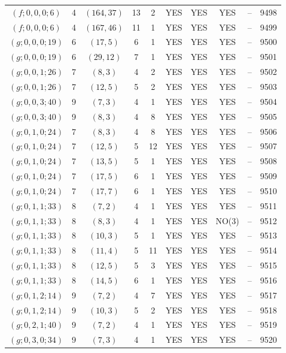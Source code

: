 \begin{longtable}{|c|c|c|c|c|c|c|c|c|c|}
$(f; 0, 0, 0; 6)$ & 4 & $(164, 37)$ & 13 & 2 & YES & YES & YES & -- & 9498\\
$(f; 0, 0, 0; 6)$ & 4 & $(167, 46)$ & 11 & 1 & YES & YES & YES & -- & 9499\\
$(g; 0, 0, 0; 19)$ & 6 & $(17, 5)$ & 6 & 1 & YES & YES & YES & -- & 9500\\
$(g; 0, 0, 0; 19)$ & 6 & $(29, 12)$ & 7 & 1 & YES & YES & YES & -- & 9501\\
$(g; 0, 0, 1; 26)$ & 7 & $(8, 3)$ & 4 & 2 & YES & YES & YES & -- & 9502\\
$(g; 0, 0, 1; 26)$ & 7 & $(12, 5)$ & 5 & 2 & YES & YES & YES & -- & 9503\\
$(g; 0, 0, 3; 40)$ & 9 & $(7, 3)$ & 4 & 1 & YES & YES & YES & -- & 9504\\
$(g; 0, 0, 3; 40)$ & 9 & $(8, 3)$ & 4 & 8 & YES & YES & YES & -- & 9505\\
$(g; 0, 1, 0; 24)$ & 7 & $(8, 3)$ & 4 & 8 & YES & YES & YES & -- & 9506\\
$(g; 0, 1, 0; 24)$ & 7 & $(12, 5)$ & 5 & 12 & YES & YES & YES & -- & 9507\\
$(g; 0, 1, 0; 24)$ & 7 & $(13, 5)$ & 5 & 1 & YES & YES & YES & -- & 9508\\
$(g; 0, 1, 0; 24)$ & 7 & $(17, 5)$ & 6 & 1 & YES & YES & YES & -- & 9509\\
$(g; 0, 1, 0; 24)$ & 7 & $(17, 7)$ & 6 & 1 & YES & YES & YES & -- & 9510\\
$(g; 0, 1, 1; 33)$ & 8 & $(7, 2)$ & 4 & 1 & YES & YES & YES & -- & 9511\\
$(g; 0, 1, 1; 33)$ & 8 & $(8, 3)$ & 4 & 1 & YES & YES & NO(3) & -- & 9512\\
$(g; 0, 1, 1; 33)$ & 8 & $(10, 3)$ & 5 & 1 & YES & YES & YES & -- & 9513\\
$(g; 0, 1, 1; 33)$ & 8 & $(11, 4)$ & 5 & 11 & YES & YES & YES & -- & 9514\\
$(g; 0, 1, 1; 33)$ & 8 & $(12, 5)$ & 5 & 3 & YES & YES & YES & -- & 9515\\
$(g; 0, 1, 1; 33)$ & 8 & $(14, 5)$ & 6 & 1 & YES & YES & YES & -- & 9516\\
$(g; 0, 1, 2; 14)$ & 9 & $(7, 2)$ & 4 & 7 & YES & YES & YES & -- & 9517\\
$(g; 0, 1, 2; 14)$ & 9 & $(10, 3)$ & 5 & 2 & YES & YES & YES & -- & 9518\\
$(g; 0, 2, 1; 40)$ & 9 & $(7, 2)$ & 4 & 1 & YES & YES & YES & -- & 9519\\
$(g; 0, 3, 0; 34)$ & 9 & $(7, 3)$ & 4 & 1 & YES & YES & YES & -- & 9520\\

\end{longtable}
